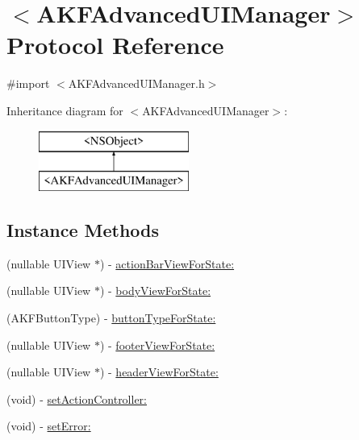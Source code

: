 \hypertarget{protocol_a_k_f_advanced_u_i_manager-p}{}\section{$<$A\+K\+F\+Advanced\+U\+I\+Manager$>$ Protocol Reference}
\label{protocol_a_k_f_advanced_u_i_manager-p}


{\ttfamily \#import $<$A\+K\+F\+Advanced\+U\+I\+Manager.\+h$>$}

Inheritance diagram for $<$A\+K\+F\+Advanced\+U\+I\+Manager$>$\+:\begin{figure}[H]
\begin{center}
\leavevmode
\includegraphics[height=2.000000cm]{protocol_a_k_f_advanced_u_i_manager-p}
\end{center}
\end{figure}
\subsection*{Instance Methods}
\begin{DoxyCompactItemize}
\item 
(nullable U\+I\+View $\ast$) -\/ \hyperlink{protocol_a_k_f_advanced_u_i_manager-p_a51fbcffbea55b19f0f3c91d147452239}{action\+Bar\+View\+For\+State\+:}
\item 
(nullable U\+I\+View $\ast$) -\/ \hyperlink{protocol_a_k_f_advanced_u_i_manager-p_a6d6a138374d8e92d1307b934357b3ed7}{body\+View\+For\+State\+:}
\item 
(A\+K\+F\+Button\+Type) -\/ \hyperlink{protocol_a_k_f_advanced_u_i_manager-p_ad945c401524db9e22a3f21dc24ce2d2f}{button\+Type\+For\+State\+:}
\item 
(nullable U\+I\+View $\ast$) -\/ \hyperlink{protocol_a_k_f_advanced_u_i_manager-p_a9896a3b03c43247bd2e7cd30b8e89da8}{footer\+View\+For\+State\+:}
\item 
(nullable U\+I\+View $\ast$) -\/ \hyperlink{protocol_a_k_f_advanced_u_i_manager-p_a2f3c0ba67fdd0a279ccf1f2f93603cd4}{header\+View\+For\+State\+:}
\item 
(void) -\/ \hyperlink{protocol_a_k_f_advanced_u_i_manager-p_a043d07a7e11fd542c12064ca4789ffe7}{set\+Action\+Controller\+:}
\item 
(void) -\/ \hyperlink{protocol_a_k_f_advanced_u_i_manager-p_a1e844c4c24df443fd55e99edf1cb511f}{set\+Error\+:}
\end{DoxyCompactItemize}


